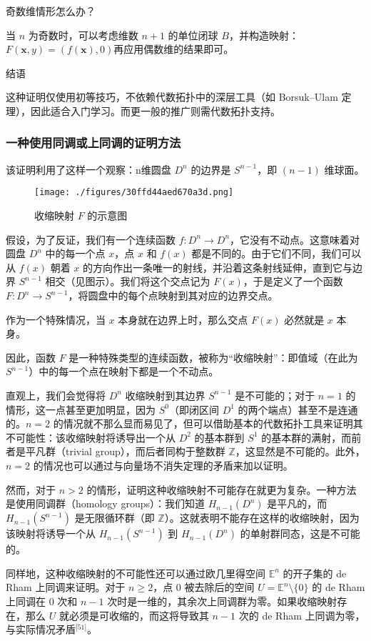 奇数维情形怎么办？

当 $n$ 为奇数时，可以考虑维数 $n+1$ 的单位闭球 $B$，并构造映射：$F(\mathbf{x}, y) = (f(\mathbf{x}), 0)$再应用偶数维的结果即可。

结语

这种证明仅使用初等技巧，不依赖代数拓扑中的深层工具（如 Borsuk–Ulam 定理），因此适合入门学习。而更一般的推广则需代数拓扑支持。
\subsubsection{一种使用同调或上同调的证明方法}
该证明利用了这样一个观察：n维圆盘 $D^n$ 的边界是 $S^{n-1}$，即 $(n-1)$ 维球面。
\begin{figure}[ht]
\centering
\texttt{[image: ./figures/30ffd44aed670a3d.png]}
\caption{收缩映射 $F$ 的示意图} \label{fig_BLWRbd_5}
\end{figure}
假设，为了反证，我们有一个连续函数 $f : D^n \to D^n$，它没有不动点。这意味着对圆盘 $D^n$ 中的每一个点 $x$，点 $x$ 和 $f(x)$ 都是不同的。由于它们不同，我们可以从 $f(x)$ 朝着 $x$ 的方向作出一条唯一的射线，并沿着这条射线延伸，直到它与边界 $S^{n-1}$ 相交（见图示）。我们将这个交点记为 $F(x)$，于是定义了一个函数 $F : D^n \to S^{n-1}$，将圆盘中的每个点映射到其对应的边界交点。

作为一个特殊情况，当 $x$ 本身就在边界上时，那么交点 $F(x)$ 必然就是 $x$ 本身。

因此，函数 $F$ 是一种特殊类型的连续函数，被称为“收缩映射”：即值域（在此为 $S^{n-1}$）中的每一个点在映射下都是一个不动点。

直观上，我们会觉得将 $D^n$ 收缩映射到其边界 $S^{n-1}$ 是不可能的；对于 $n = 1$ 的情形，这一点甚至更加明显，因为 $S^0$（即闭区间 $D^1$ 的两个端点）甚至不是连通的。$n = 2$ 的情况就不那么显而易见了，但可以借助基本的代数拓扑工具来证明其不可能性：该收缩映射将诱导出一个从 $D^2$ 的基本群到 $S^1$ 的基本群的满射，而前者是平凡群（trivial group），而后者同构于整数群 $\mathbb{Z}$，这显然是不可能的。此外，$n = 2$ 的情况也可以通过与向量场不消失定理的矛盾来加以证明。

然而，对于 $n > 2$ 的情形，证明这种收缩映射不可能存在就更为复杂。一种方法是使用同调群（homology groups）：我们知道 $H_{n-1}(D^n)$ 是平凡的，而 $H_{n-1}(S^{n-1})$ 是无限循环群（即 $\mathbb{Z}$）。这就表明不能存在这样的收缩映射，因为该映射将诱导一个从 $H_{n-1}(S^{n-1})$ 到 $H_{n-1}(D^n)$ 的单射群同态，这是不可能的。

同样地，这种收缩映射的不可能性还可以通过欧几里得空间 $\mathbb{E}^n$ 的开子集的 de Rham 上同调来证明。对于 $n \geq 2$，点 $0$ 被去除后的空间 $U = \mathbb{E}^n \setminus \{0\}$ 的 de Rham 上同调在 0 次和 $n-1$ 次时是一维的，其余次上同调群为零。如果收缩映射存在，那么 $U$ 就必须是可收缩的，而这将导致其 $n-1$ 次的 de Rham 上同调为零，与实际情况矛盾\(^\text{[51]}\)。
